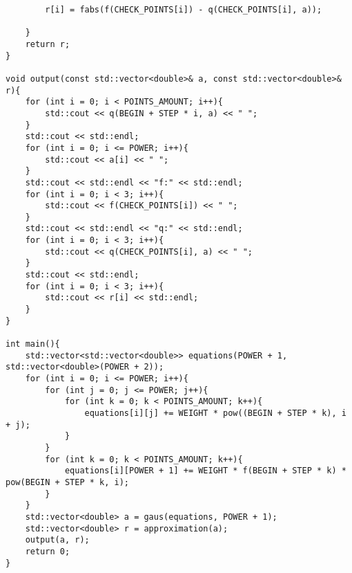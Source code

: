 \documentclass[10pt]{scrartcl}
\begin{document}
\begin{verbatim}
        r[i] = fabs(f(CHECK_POINTS[i]) - q(CHECK_POINTS[i], a));

    }
    return r;
}

void output(const std::vector<double>& a, const std::vector<double>& r){
    for (int i = 0; i < POINTS_AMOUNT; i++){
        std::cout << q(BEGIN + STEP * i, a) << " ";
    }
    std::cout << std::endl;
    for (int i = 0; i <= POWER; i++){
        std::cout << a[i] << " ";
    }
    std::cout << std::endl << "f:" << std::endl;
    for (int i = 0; i < 3; i++){
        std::cout << f(CHECK_POINTS[i]) << " ";
    }
    std::cout << std::endl << "q:" << std::endl;
    for (int i = 0; i < 3; i++){
        std::cout << q(CHECK_POINTS[i], a) << " ";
    }
    std::cout << std::endl;
    for (int i = 0; i < 3; i++){
        std::cout << r[i] << std::endl;
    }
}

int main(){
    std::vector<std::vector<double>> equations(POWER + 1, std::vector<double>(POWER + 2));
    for (int i = 0; i <= POWER; i++){
        for (int j = 0; j <= POWER; j++){
            for (int k = 0; k < POINTS_AMOUNT; k++){
                equations[i][j] += WEIGHT * pow((BEGIN + STEP * k), i + j);
            }
        }
        for (int k = 0; k < POINTS_AMOUNT; k++){
            equations[i][POWER + 1] += WEIGHT * f(BEGIN + STEP * k) * pow(BEGIN + STEP * k, i);
        }
    }
    std::vector<double> a = gaus(equations, POWER + 1);
    std::vector<double> r = approximation(a);
    output(a, r);
    return 0;
}
\end{verbatim}
\end{document}
